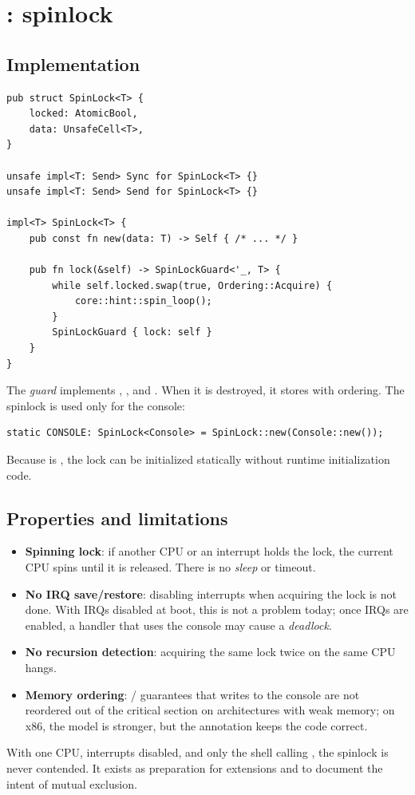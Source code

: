 \section{: spinlock}

\subsection{Implementation}

\begin{lstlisting}[caption={Spinlock with \code{AtomicBool}.},label={lst:spinlock}]
pub struct SpinLock<T> {
    locked: AtomicBool,
    data: UnsafeCell<T>,
}

unsafe impl<T: Send> Sync for SpinLock<T> {}
unsafe impl<T: Send> Send for SpinLock<T> {}

impl<T> SpinLock<T> {
    pub const fn new(data: T) -> Self { /* ... */ }

    pub fn lock(&self) -> SpinLockGuard<'_, T> {
        while self.locked.swap(true, Ordering::Acquire) {
            core::hint::spin_loop();
        }
        SpinLockGuard { lock: self }
    }
}
\end{lstlisting}

The \emph{guard} implements , , and . When it is
destroyed, it stores  with  ordering. The
spinlock is used only for the console:

\begin{lstlisting}[caption={Global console protected by a spinlock.},label={lst:consoleglobal}]
static CONSOLE: SpinLock<Console> = SpinLock::new(Console::new());
\end{lstlisting}

Because  is , the lock can be initialized
statically without runtime initialization code.

\subsection{Properties and limitations}

\begin{itemize}
  \item \textbf{Spinning lock}: if another CPU or an interrupt
        holds the lock, the current CPU spins until it is released. There is no
        \emph{sleep} or timeout.
  \item \textbf{No IRQ save/restore}: disabling interrupts when
        acquiring the lock is not done. With IRQs disabled at boot, this is
        not a problem today; once IRQs are enabled, a handler that uses the
        console may cause a \emph{deadlock}.
  \item \textbf{No recursion detection}: acquiring the same lock twice
        on the same CPU hangs.
  \item \textbf{Memory ordering}: / guarantees
        that writes to the console are not reordered out of the
        critical section on architectures with weak memory; on x86,
        the model is stronger, but the annotation keeps the code
        correct.
\end{itemize}

\begin{nota}
With one CPU, interrupts disabled, and only the shell calling
, the spinlock is never contended. It exists as preparation
for extensions and to document the intent of mutual exclusion.
\end{nota}
